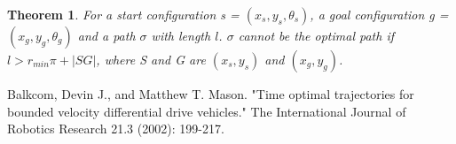 \documentclass[12pt]{article}
\newtheorem{theorem}{Theorem}[section]
\begin{document}
  \begin{theorem}
  	For a start configuration s = $(x_{s},y_{s},\theta_{s})$, a goal configuration g = $(x_{g},y_{g},\theta_{g})$ and a path $\sigma$ with length $l$. $\sigma$ cannot be the optimal path if $l > r_{min}\pi + |SG|$, where S and G are $(x_{s}, y_{s})$ and $(x_{g}, y_{g})$.
  \end{theorem} 
  
  
  
  
  
  \begin{thebibliography}{1}

   Balkcom, Devin J., and Matthew T. Mason. "Time optimal trajectories for bounded velocity differential drive vehicles." The International Journal of Robotics Research 21.3 (2002): 199-217.

  \end{thebibliography}
  
\end{document}
